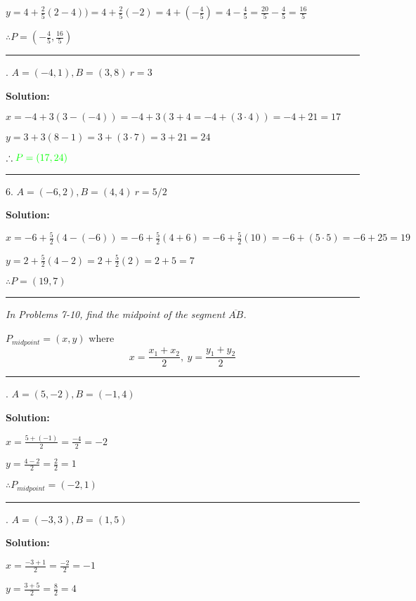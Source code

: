 \documentclass[10pt,letterpaper]{article}
\begin{document}
\smallskip
$y=4+\frac{2}{5}(2-4))=4+\frac{2}{5}(-2)=4+(-\frac{4}{5})=4-\frac{4}{5}=\frac{20}{5}-\frac{4}{5}=\frac{16}{5}$

\smallskip
$\therefore P=(-\frac{4}{5},\frac{16}{5})$

\noindent\rule{15cm}{0.4pt}

. $A=(-4,1), B=(3,8)\  r=3$

\medskip
{} {\textbf{{\color{blue}Solution}:}}

\smallskip
$x=-4+3(3-(-4))=-4+3(3+4=-4+(3 \cdot 4))=-4+21=17$

\smallskip
$y=3+3(8-1)=3+(3\cdot7)=3+21=24$

\smallskip
$\therefore \color{green}P=(17,24)$

\noindent\rule{15cm}{0.4pt}
\pagebreak

6. $A=(-6,2), B=(4,4)\  r=5/2$

\medskip
{} {\textbf{{\color{blue}Solution}:}}

\smallskip
$x=-6+\frac{5}{2}(4-(-6))=-6+\frac{5}{2}(4+6)=-6+\frac{5}{2}(10)=-6+(5\cdot5)=-6+25=19$

\smallskip
$y=2+\frac{5}{2}(4-2)=2+\frac{5}{2}(2)=2+5=7$

\smallskip
$\therefore P=(19,7)$

\noindent\rule{15cm}{0.4pt}

\medskip
\textit{In Problems 7-10, find the midpoint of the segment $\overline{AB}$.}
\medskip

$P_{midpoint} = (x,y)$ where 
\[ x=\frac{x_1 + x_2}{2},\  y=\frac{y_1 + y_2}{2} \]
\medskip

\noindent\rule{15cm}{0.4pt}

. $A=(5,-2), B=(-1,4)$

\medskip
{} {\textbf{{\color{blue}Solution}:}}

\smallskip
$x=\frac{5+(-1)}{2}=\frac{-4}{2}=-2$

\smallskip
$y=\frac{4-2}{2}=\frac{2}{2}=1$

\smallskip
$\therefore P_{midpoint}=(-2,1)$

\noindent\rule{15cm}{0.4pt}

. $A=(-3,3), B=(1,5)$

\medskip
{} {\textbf{{\color{blue}Solution}:}}

\smallskip
$x=\frac{-3+1}{2}=\frac{-2}{2}=-1$

\smallskip
$y=\frac{3+5}{2}=\frac{8}{2}=4$
\end{document}
